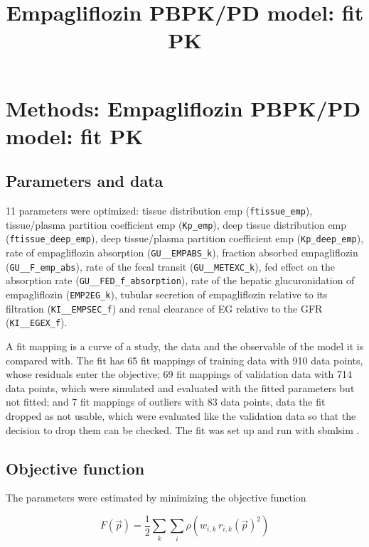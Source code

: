 \documentclass{article}
\title{Empagliflozin PBPK/PD model: fit PK}
\date{}
\begin{document}
\maketitle

\section{Methods: Empagliflozin PBPK/PD model: fit PK}

\subsection{Parameters and data}

11 parameters were optimized: tissue distribution emp (\texttt{ftissue\_emp}), tissue/plasma partition coefficient emp (\texttt{Kp\_emp}), deep tissue distribution emp (\texttt{ftissue\_deep\_emp}), deep tissue/plasma partition coefficient emp (\texttt{Kp\_deep\_emp}), rate of empagliflozin absorption (\texttt{GU\_\_EMPABS\_k}), fraction absorbed empagliflozin (\texttt{GU\_\_F\_emp\_abs}), rate of the fecal transit (\texttt{GU\_\_METEXC\_k}), fed effect on the absorption rate (\texttt{GU\_\_FED\_f\_absorption}), rate of the hepatic glucuronidation of empagliflozin (\texttt{EMP2EG\_k}), tubular secretion of empagliflozin relative to its filtration (\texttt{KI\_\_EMPSEC\_f}) and renal clearance of EG relative to the GFR (\texttt{KI\_\_EGEX\_f}).

A fit mapping is a curve of a study, the data and the observable of the model it is compared with. The fit has 65 fit mappings of training data with 910 data points, whose residuals enter the objective; 69 fit mappings of validation data with 714 data points, which were simulated and evaluated with the fitted parameters but not fitted; and 7 fit mappings of outliers with 83 data points, data the fit dropped as not usable, which were evaluated like the validation data so that the decision to drop them can be checked. The fit was set up and run with sbmlsim \cite{Koenig2026_sbmlsim}.

\subsection{Objective function}

The parameters were estimated by minimizing the objective function

\begin{equation}
F(\vec{p}) = \frac{1}{2} \sum_{k} \sum_{i} \rho\left(w_{i,k}\, r_{i,k}(\vec{p})^2\right)
\end{equation}
\end{document}
